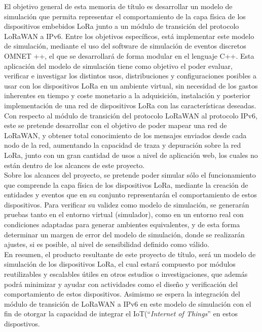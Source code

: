 \documentclass[thesis,final,oneside]{udpbook}
\begin{document}
%
%
\begin{resumen}                         %
El objetivo general de esta memoria de título es desarrollar un modelo de simulación que permita representar el comportamiento de la capa física de los dispositivos embebidos LoRa junto a un módulo de transición del protocolo LoRaWAN a IPv6. 
Entre los objetivos específicos, está implementar este modelo de simulación,  mediante el uso del software de simulación de eventos discretos OMNET ++, el que se desarrollará de forma modular en el lenguaje C++. Esta aplicación del modelo de simulación tiene como objetivo el poder evaluar, verificar e investigar los distintos usos, distribuciones y configuraciones posibles a usar con los dispositivos LoRa en un ambiente virtual, sin necesidad de los gastos inherentes en tiempo y coste monetario a la adquisición, instalación y posterior implementación de una red de dispositivos LoRa con las características deseadas.\\

Con respecto al módulo de transición del protocolo LoRaWAN al protocolo IPv6, este se pretende desarrollar con el objetivo de poder  mapear una red de LoRaWAN, y obtener total conocimiento de los mensajes enviados desde cada nodo de la red, aumentando la capacidad de traza y depuración sobre la red LoRa, junto con un gran cantidad de usos a nivel de aplicación web, los cuales no están dentro de los alcances de este proyecto.\\
Sobre los alcances del proyecto, se pretende poder simular sólo el funcionamiento que comprende la capa física de los dispositivos LoRa, mediante la creación de entidades y eventos que en su conjunto
representarán el comportamiento de estos dispositivos. Para verificar su validez como modelo de simulación, se generarán pruebas tanto en el entorno virtual (simulador), como en un entorno real con condiciones adaptadas para generar ambientes equivalentes, y de esta forma determinar un margen de error del modelo de simulación, donde se realizarán ajustes, si es posible, al nivel de sensibilidad definido como válido.\\

En resumen, el producto resultante de este proyecto de título, será un modelo de simulación de los dispositivos LoRa, el cual estará compuesto por módulos reutilizables y escalables útiles en otros estudios o investigaciones, que además podrá minimizar y ayudar con actividades como el diseño y verificación del comportamiento de estos dispositivos. Asimismo se espera la integración del módulo de transición de LoRaWAN a IPv6 en este modelo de simulación con el fin de otorgar la capacidad de integrar el IoT(``\textit{Internet of Things}'' en estos dispostivos.

\end{resumen}                           %
\end{document}
